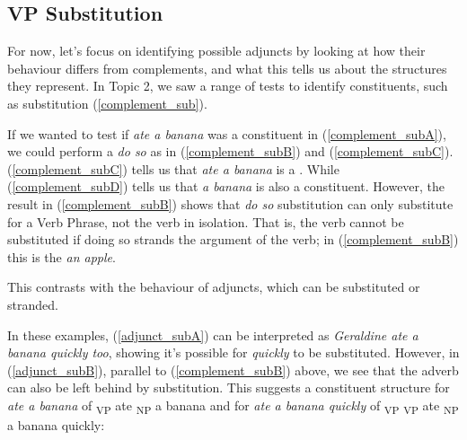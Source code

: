 \documentclass{article}
\begin{document}
\subsection{VP Substitution}
For now, let's focus on identifying possible adjuncts by looking at how their behaviour differs from complements, and what this tells us about the structures they represent.
In Topic 2, we saw a range of tests to identify constituents, such as substitution (\ref{complement_sub}).
\begin{exe}
    \label{complement_sub}
\end{exe}
If we wanted to test if \emph{ate a banana} was a constituent in (\ref{complement_subA}), we could perform a \emph{do so}  as in (\ref{complement_subB}) and (\ref{complement_subC}).
(\ref{complement_subC}) tells us that \emph{ate a banana} is a .
While (\ref{complement_subD}) tells us that \emph{a banana} is also a constituent.
However, the result in (\ref{complement_subB}) shows that \emph{do so} substitution can only substitute for a Verb Phrase, not the verb in isolation.
That is, the verb cannot be substituted if doing so strands the argument of the verb; in (\ref{complement_subB}) this is the  \emph{an apple}.

This contrasts with the behaviour of adjuncts, which can be substituted or stranded.
\begin{exe}
    \label{adjunct_sub}
\end{exe}
In these examples, (\ref{adjunct_subA}) can be interpreted as \emph{Geraldine ate a banana quickly too}, showing it's possible for \emph{quickly} to be substituted.
However, in (\ref{adjunct_subB}), parallel to (\ref{complement_subB}) above, we see that the adverb can also be left behind by substitution.
This suggests a constituent structure for \emph{ate a banana} of \lbrack{}\textsubscript{VP} ate \lbrack{}\textsubscript{NP} a banana\rbrack{}\rbrack{} and for \emph{ate a banana quickly} of \lbrack{}\textsubscript{VP} \lbrack{}\textsubscript{VP} ate \lbrack{}\textsubscript{NP} a banana\rbrack{}\rbrack{} quickly\rbrack{}:
\end{document}

